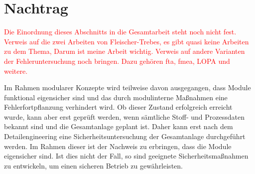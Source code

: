 \section{Nachtrag}
\textcolor{red}{Die Einordnung dieses Abschnitts in die Gesamtarbeit steht noch nicht fest.}
\textcolor{red}{Verweis auf die zwei Arbeiten von Fleischer-Trebes, es gibt quasi keine Arbeiten zu dem Thema, Darum ist meine Arbeit wichtig.}
\textcolor{red}{Verweis auf andere Varianten der Fehleruntersuchung noch bringen. Dazu geh\"oren \ac{fta}, \ac{fmea}, LOPA und weitere. }

Im Rahmen modularer Konzepte wird teilweise davon ausgegangen, dass Module funktional eigensicher sind und das durch modulinterne Ma\ss{}nahmen eine Fehlerfortpflanzung verhindert wird. \cite[S. 4]{Urbas_2012a} Ob dieser Zustand erfolgreich erreicht wurde, kann aber erst gepr\"uft werden, wenn s\"amtliche Stoff- und Prozessdaten bekannt sind und die Gesamtanlage geplant ist. Daher kann erst nach dem Detailengineering eine Sicherheitsuntersuchung der Gesamtanlage durchgef\"uhrt werden. Im Rahmen dieser ist der Nachweis zu erbringen, dass die Module eigensicher sind. Ist dies nicht der Fall, so sind geeignete Sicherheitsma\ss{}nahmen zu entwickeln, um einen sicheren Betrieb zu gew\"ahrleisten.  